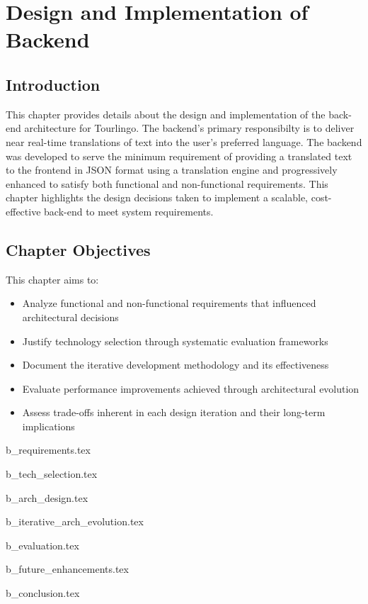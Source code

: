 \section{Design and Implementation of Backend}

\subsection{Introduction}
This chapter provides details about the design and implementation of the back-end architecture for Tourlingo. The backend's primary responsibilty is to deliver near real-time translations of text into the user's preferred language. The backend was developed to serve the minimum requirement of providing a translated text to the frontend in 
JSON format using a translation engine and progressively enhanced to satisfy both functional and non-functional requirements. This chapter highlights the design decisions taken to implement a scalable, cost-effective back-end to meet system requirements.

\subsection{Chapter Objectives}

This chapter aims to:

\begin{itemize}
    \item Analyze functional and non-functional requirements that influenced architectural decisions
    \item Justify technology selection through systematic evaluation frameworks
    \item Document the iterative development methodology and its effectiveness
    \item Evaluate performance improvements achieved through architectural evolution
    \item Assess trade-offs inherent in each design iteration and their long-term implications
\end{itemize}

{b_requirements.tex}

{b_tech_selection.tex}

{b_arch_design.tex}

{b_iterative_arch_evolution.tex}

{b_evaluation.tex}

{b_future_enhancements.tex}

{b_conclusion.tex}